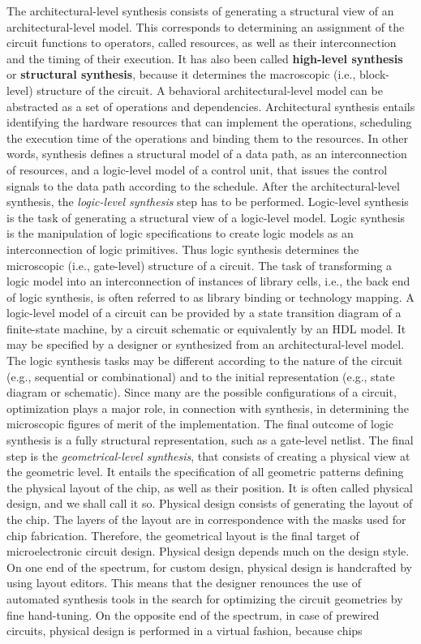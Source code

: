 The architectural-\/level synthesis consists of generating a structural view of an architectural-\/level model. This corresponds to determining an assignment of the circuit functions to operators, called resources, as well as their interconnection and the timing of their execution. It has also been called {\bfseries high-\/level synthesis} or {\bfseries structural synthesis}, because it determines the macroscopic (i.\+e., block-\/level) structure of the circuit. A behavioral architectural-\/level model can be abstracted as a set of operations and dependencies. Architectural synthesis entails identifying the hardware resources that can implement the operations, scheduling the execution time of the operations and binding them to the resources. In other words, synthesis defines a structural model of a data path, as an interconnection of resources, and a logic-\/level model of a control unit, that issues the control signals to the data path according to the schedule. After the architectural-\/level synthesis, the {\itshape logic-\/level synthesis} step has to be performed. Logic-\/level synthesis is the task of generating a structural view of a logic-\/level model. Logic synthesis is the manipulation of logic specifications to create logic models as an interconnection of logic primitives. Thus logic synthesis determines the microscopic (i.\+e., gate-\/level) structure of a circuit. The task of transforming a logic model into an interconnection of instances of library cells, i.\+e., the back end of logic synthesis, is often referred to as library binding or technology mapping. A logic-\/level model of a circuit can be provided by a state transition diagram of a finite-\/state machine, by a circuit schematic or equivalently by an H\+DL model. It may be specified by a designer or synthesized from an architectural-\/level model. The logic synthesis tasks may be different according to the nature of the circuit (e.\+g., sequential or combinational) and to the initial representation (e.\+g., state diagram or schematic). Since many are the possible configurations of a circuit, optimization plays a major role, in connection with synthesis, in determining the microscopic figures of merit of the implementation. The final outcome of logic synthesis is a fully structural representation, such as a gate-\/level netlist. The final step is the {\itshape geometrical-\/level synthesis}, that consists of creating a physical view at the geometric level. It entails the specification of all geometric patterns defining the physical layout of the chip, as well as their position. It is often called physical design, and we shall call it so. Physical design consists of generating the layout of the chip. The layers of the layout are in correspondence with the masks used for chip fabrication. Therefore, the geometrical layout is the final target of microelectronic circuit design. Physical design depends much on the design style. On one end of the spectrum, for custom design, physical design is handcrafted by using layout editors. This means that the designer renounces the use of automated synthesis tools in the search for optimizing the circuit geometries by fine hand-\/tuning. On the opposite end of the spectrum, in case of prewired circuits, physical design is performed in a virtual fashion, because chips 